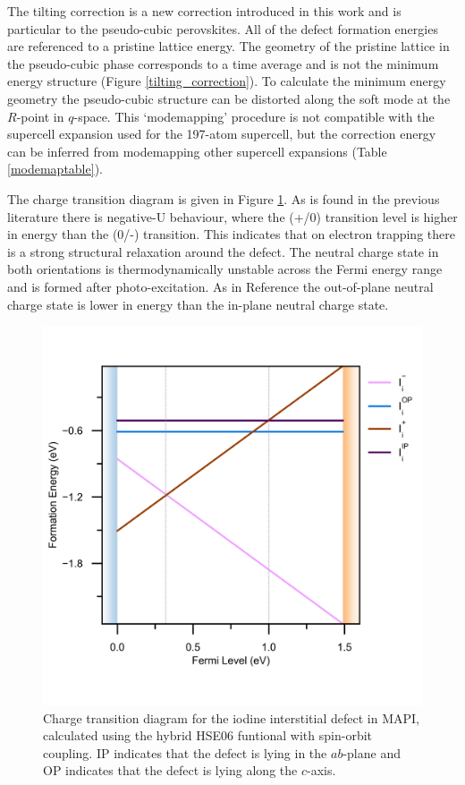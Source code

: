 The tilting correction is a new correction introduced in this work and is particular to the pseudo-cubic perovskites. All of the defect formation energies are referenced to a pristine lattice energy. The geometry of the pristine lattice in the pseudo-cubic phase corresponds to a time average and is not the minimum energy structure (Figure \ref{tilting_correction}). To calculate the minimum energy geometry the pseudo-cubic structure can be distorted along the soft mode at the $R$-point in $q$-space. This `modemapping' procedure\autocite{Skelton2016a} is not compatible with the supercell expansion used for the 197-atom supercell, but the correction energy can be inferred from modemapping other supercell expansions (Table \ref{modemaptable}).

The charge transition diagram is given in Figure \ref{charge_transition_diagram}. 
As is found in the previous literature\autocite{Du2015,Meggiolaro2018} there is negative-U behaviour, where the (+/0) transition level is higher in energy than the (0/-) transition. This indicates that on electron trapping there is a strong structural relaxation around the defect. The neutral charge state in both orientations is thermodynamically unstable across the Fermi energy range and is formed after photo-excitation. As in Reference \cite{Meggiolaro2018} the out-of-plane neutral charge state is lower in energy than the in-plane neutral charge state.

\begin{figure}[h!]   
\centering
  \includegraphics[width=0.7\columnwidth]{figures/ch6/charge_transition_HSE.png}
  \caption[Charge transition diagram for the iodine interstitial defect in MAPI]{Charge transition diagram for the iodine interstitial defect in MAPI, calculated using the hybrid HSE06 funtional with spin-orbit coupling. IP indicates that the defect is lying in the $ab$-plane and OP indicates that the defect is lying along the $c$-axis.}
\label{charge_transition_diagram}
\end{figure}

